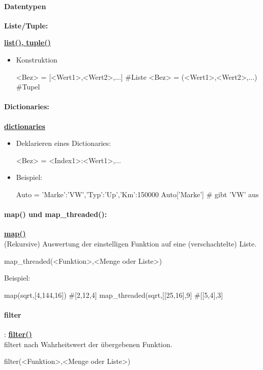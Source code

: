 \documentclass[a4paper,9pt,DIV15,twocolumn]{scrartcl}
\begin{document}
\paragraph{Datentypen}
\textbf{Liste/Tuple:} 	{\href{http://docs.python.org/library/functions.html#list}{\textbf{list(),} } \href{http://docs.python.org/library/functions.html#tuple}{\textbf{tuple()}}
\begin{itemize}
 \item Konstruktion
\begin{sageinsmall}
<Bez> = [<Wert1>,<Wert2>,...] #Liste
<Bez> = (<Wert1>,<Wert2>,...) #Tupel
\end{sageinsmall}
\end{itemize}
\paragraph{Dictionaries:}		\href{http://docs.python.org/library/stdtypes.html?highlight=.update#mapping-types-dict}{\textbf{dictionaries}}
\begin{itemize}
 \item Deklarieren eines Dictionaries:
\begin{sageinsmall}
<Bez> = {<Index1>:<Wert1>,...}
\end{sageinsmall}
 \item Beispiel:
\begin{sageinsmall}
Auto = {'Marke':'VW','Typ':'Up','Km':150000}
Auto['Marke']		# gibt 'VW' aus
\end{sageinsmall}
\end{itemize}

\paragraph{map() und map\_threaded():} \href{https://sage.math.uni-goettingen.de/doc/static/reference/sage/combinat/generator.html?highlight=map#sage.combinat.generator.map}{\textbf{map()}\\}
(Rekursive) Auswertung der einstelligen Funktion auf eine (verschachtelte) Liste.
\begin{sageinsmall}
 map_threaded(<Funktion>,<Menge oder Liste>)
\end{sageinsmall}
Beispiel:
\begin{sageinsmall}
 map(sqrt,[4,144,16]) 			#[2,12,4]
 map_threaded(sqrt,[[25,16],9]	#[[5,4],3]
\end{sageinsmall}

\paragraph{filter}: \href{https://sage.math.uni-goettingen.de/doc/static/reference/sage/combinat/combinat.html?highlight=filter#sage.combinat.combinat.CombinatorialClass.filter}{\textbf{filter()}}\\ filtert nach Wahrheitswert der übergebenen Funktion. 
\begin{sageinsmall}
filter(<Funktion>,<Menge oder Liste>)
\end{sageinsmall}

}
\end{document}
